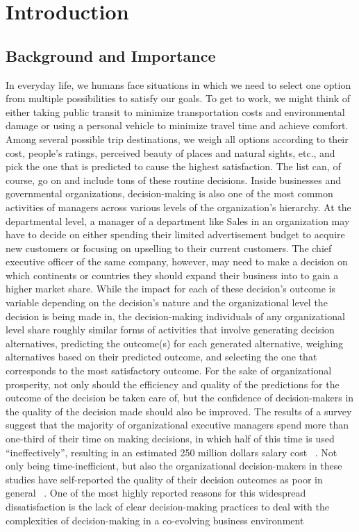 \documentclass{sfuthesis}
\begin{document}
%
%

\mainmatter

\chapter{Introduction}
\section{Background and Importance}
In everyday life, we humans face situations in which we need to select one option from multiple possibilities to satisfy our goals. To get to work, we might think of either taking public transit to minimize transportation costs and environmental damage or using a personal vehicle to minimize travel time and achieve comfort. Among several possible trip destinations, we weigh all options according to their cost, people’s ratings, perceived beauty of places and natural sights, etc., and pick the one that is predicted to cause the highest satisfaction. The list can, of course, go on and include tons of these routine decisions. Inside businesses and governmental organizations, decision-making is also one of the most common activities of managers across various levels of the organization’s hierarchy. At the departmental level, a manager of a department like Sales in an organization may have to decide on either spending their limited advertisement budget to acquire new customers or focusing on upselling to their current customers. The chief executive officer of the same company, however, may need to make a decision on which continents or countries they should expand their business into to gain a higher market share. While the impact for each of these decision’s outcome is variable depending on the decision’s nature and the organizational level the decision is being made in, the decision-making individuals of any organizational level share roughly similar forms of activities that involve generating decision alternatives, predicting the outcome(s) for each generated alternative, weighing alternatives based on their predicted outcome, and selecting the one that corresponds to the most satisfactory outcome. For the sake of organizational prosperity, not only should the efficiency and quality of the predictions for the outcome of the decision be taken care of, but the confidence of decision-makers in the quality of the decision made should also be improved. The results of a survey suggest that the majority of organizational executive managers spend more than one-third of their time on making decisions, in which half of this time is used “ineffectively”, resulting in an estimated 250 million dollars salary cost ~\cite{smet_three_nodate}. Not only being time-inefficient, but also the organizational decision-makers in these studies have self-reported the quality of their decision outcomes as poor in general ~\cite{smet_three_nodate}. One of the most highly reported reasons for this widespread dissatisfaction is the lack of clear decision-making practices to deal with the complexities of decision-making in a co-evolving business environment 
\end{document}
